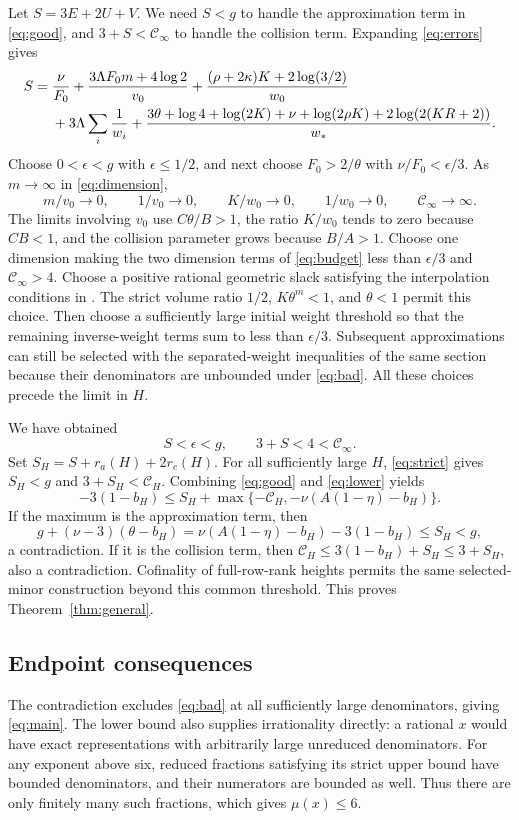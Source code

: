 \documentclass[11pt]{article}
\theoremstyle{remark}
\begin{document}
Let $S=3E+2U+V$. We need $S<g$ to handle the approximation term in
\eqref{eq:good}, and $3+S<\mathcal C_\infty$ to handle the collision
term. Expanding \eqref{eq:errors} gives
\begin{align}\label{eq:budget}
 S={}&\frac\nu{F_0}
 +\frac{3\Lambda F_0m+4\log2}{v_0}
 +\frac{(\rho+2\kappa)K+2\log(3/2)}{w_0}\notag\\
 &+3\Lambda\sum_i\frac1{w_i}
 +\frac{3\theta+\log4+\log(2K)+\nu+\log(2\rho K)
             +2\log(2(KR+2))}{w_*}.
\end{align}
Choose $0<\epsilon<g$ with $\epsilon\le1/2$, and next choose
$F_0>2/\theta$ with $\nu/F_0<\epsilon/3$.
As $m\to\infty$ in \eqref{eq:dimension},
\[
 m/v_0\to0,\qquad 1/v_0\to0,\qquad K/w_0\to0,
 \qquad 1/w_0\to0,\qquad\mathcal C_\infty\to\infty.
\]
The limits involving $v_0$ use $C\theta/B>1$, the ratio $K/w_0$ tends
to zero because $CB<1$, and the collision parameter grows because
$B/A>1$. Choose one dimension making the two dimension terms of
\eqref{eq:budget} less than $\epsilon/3$ and
$\mathcal C_\infty>4$. Choose a positive rational geometric slack
satisfying the interpolation conditions in \cite[Section 4]{affine}.
The strict volume ratio $1/2$, $K\theta^m<1$, and $\theta<1$ permit
this choice. Then choose a sufficiently large initial
weight threshold so that the remaining inverse-weight terms sum to
less than $\epsilon/3$. Subsequent approximations can still be selected
with the separated-weight inequalities of the same section because
their denominators are unbounded under \eqref{eq:bad}. All these choices
precede the limit in $H$.

We have obtained
\begin{equation}\label{eq:strict}
 S<\epsilon<g,\qquad 3+S<4<\mathcal C_\infty.
\end{equation}
Set $S_H=S+r_a(H)+2r_c(H)$. For all sufficiently large $H$,
\eqref{eq:strict} gives $S_H<g$ and $3+S_H<\mathcal C_H$.
Combining \eqref{eq:good} and \eqref{eq:lower} yields
\[
 -3(1-b_H)\le S_H+
 \max\{-\mathcal C_H,-\nu(A(1-\eta)-b_H)\}.
\]
If the maximum is the approximation term, then
\[
 g+(\nu-3)(\theta-b_H)
 =\nu(A(1-\eta)-b_H)-3(1-b_H)\le S_H<g,
\]
a contradiction. If it is the collision term, then
$\mathcal C_H\le3(1-b_H)+S_H\le3+S_H$, also a contradiction.
Cofinality of full-row-rank heights permits the same selected-minor
construction beyond this common threshold. This proves
Theorem~\ref{thm:general}.

\subsection{Endpoint consequences}\label{sec:endpoint}
The contradiction excludes \eqref{eq:bad} at all sufficiently large
denominators, giving \eqref{eq:main}. The lower bound also supplies
irrationality directly: a rational $x$ would have exact representations
with arbitrarily large unreduced denominators.
For any exponent above six, reduced fractions satisfying its strict
upper bound have bounded denominators, and their numerators are
bounded as well. Thus there are only finitely many such fractions,
which gives $\mu(x)\le6$.
\end{document}
